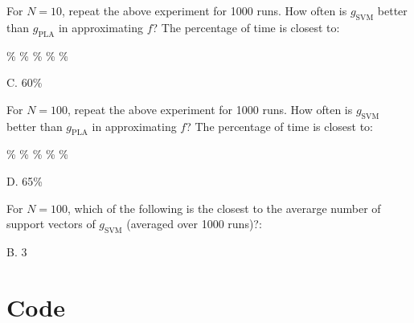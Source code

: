 \documentclass[answers]{exam}
\begin{document}
\begin{questions}
\setcounter{question}{7}
\question For $N=10$, repeat the above experiment for 1000 runs. How often is
$g_{\text{SVM}}$ better than $g_{\text{PLA}}$ in approximating $f$? The 
percentage of time is closest to:

\begin{choices}
\% 
\% 
\% 
\% 
\% 
\end{choices}

\begin{solution}
C. 60\% 
\end{solution}

\question For $N=100$, repeat the above experiment for 1000 runs. How often is
$g_{\text{SVM}}$ better than $g_{\text{PLA}}$ in approximating $f$? The 
percentage of time is closest to:

\begin{choices}
\% 
\% 
\% 
\% 
\% 
\end{choices}

\begin{solution}
D. 65\%
\end{solution}

\question For $N=100$, which of the following is the closest to the averarge
number of support vectors of $g_{\text{SVM}}$ (averaged over 1000 runs)?:

\begin{choices}
\end{choices}

\begin{solution}
B. 3
\end{solution}
\end{questions}

\section*{Code}






\end{document}

